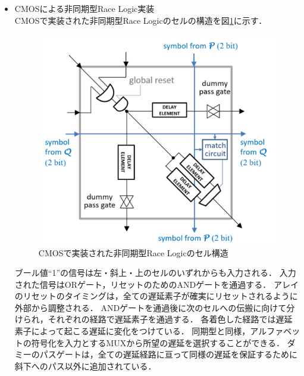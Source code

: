 \begin{itemize}
ブール値“1”の信号は左・斜上・上のセルのいずれからも入力される．
入力された信号はORゲートを通過して、飽和アップカウンタにおいてNクロックサイクルに0をカウントする．この飽和アップカウンタをクロックと同期させる．
これにより，1つのセルを通過し，右・下のセルへと伝搬する際に1クロックサイクルを要する．
各着色ゲートでは伝搬信号に対してそれぞれ違う伝搬遅延時間を付加し，
MUXで所望の伝搬遅延時間を付加するゲートからの出力を選択することができる．
生成される出力信号がパルスではなく固定ブール値“1”であることを確実にするために，到着回路のセットが配置され，各計算の最後にリセットされている．

図\ref{fig:CMOSsync}のセルを繰り返した構造を持つアレイに信号が入力された時から出力信号を得るまでのクロック数をカウントするカウンタがアレイ外部に存在する．
このカウンタが計測した値が最短経路をパスした時のクロック数となる．

\item CMOSによる非同期型Race Logic実装\\
CMOSで実装された非同期型Race Logicのセルの構造を図\ref{fig:CMOSasync}に示す．
\begin{figure}[t!]
\begin{center}
\includegraphics[keepaspectratio,scale=0.3]{fig/2/CMOSasync.png}
\caption{CMOSで実装された非同期型Race Logicのセル構造\cite{madhavan20174}}
\label{fig:CMOSasync}
\end{center}
\end{figure}

ブール値“1”の信号は左・斜上・上のセルのいずれからも入力される．
入力された信号はORゲート，リセットのためのANDゲートを通過する．
アレイのリセットのタイミングは，全ての遅延素子が確実にリセットされるように外部から調整される．
ANDゲートを通過後に次のセルへの伝搬に向けて分けられ，それぞれの経路で遅延素子を通過する．
各着色した経路では遅延素子によって起こる遅延に変化をつけている．
同期型と同様，アルファベットの符号化を入力とするMUXから所望の遅延を選択することができる．
ダミーのパスゲートは，全ての遅延経路に亘って同様の遅延を保証するために斜下へのパス以外に追加されている．


\end{itemize}
